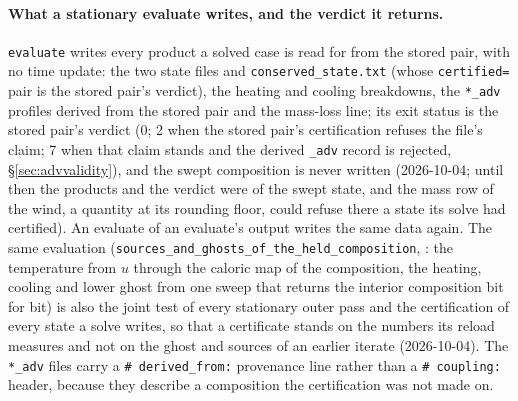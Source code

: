 \documentclass[english,a4paper]{my_memo}
\begin{document}
\paragraph{What a stationary evaluate writes, and the verdict it returns.}\label{sec:evaluate}
\texttt{evaluate} writes every product a solved case is read for from the
stored pair, with no time update: the two state files and
\texttt{conserved\_state.txt} (whose \texttt{certified=} pair is the
stored pair's verdict), the heating and cooling breakdowns, the
\texttt{*\_adv} profiles derived from the stored pair and the mass-loss
line; its exit status is the stored pair's verdict (0; 2 when the stored
pair's certification refuses the file's claim; 7 when that claim stands and
the derived \texttt{\_adv} record is rejected, \S\ref{sec:advvalidity}),
and the swept composition is never written (2026-10-04; until then the products and the
verdict were of the swept state, and the mass row of the wind, a quantity at
its rounding floor, could refuse there a state its solve had certified).
An evaluate of an evaluate's output writes the same data again. The same
evaluation (\texttt{sources\_and\_ghosts\_of\_}\allowbreak\texttt{the\_held\_composition},
: the temperature from $u$ through the caloric map of
the composition, the heating, cooling and lower ghost from one sweep that
returns the interior composition bit for bit) is also the joint test of
every stationary outer pass and the certification of every state a solve
writes, so that a certificate stands on the numbers its reload measures and
not on the ghost and sources of an earlier iterate (2026-10-04).
The \texttt{*\_adv} files carry a \texttt{\# derived\_from:} provenance
line rather than a \texttt{\# coupling:} header, because they describe a
composition the certification was not made on.
\end{document}
